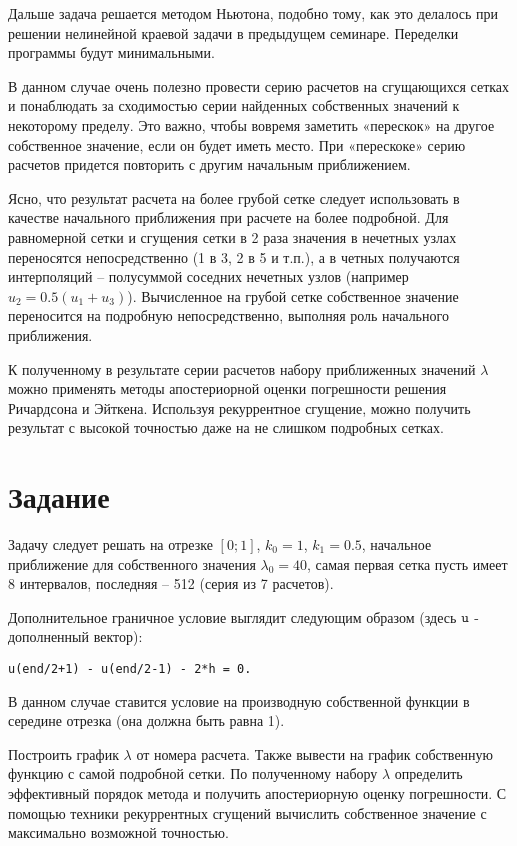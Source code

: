 Дальше задача решается методом Ньютона, подобно тому, как это делалось при решении нелинейной краевой задачи в предыдущем семинаре. Переделки программы будут минимальными.

В данном случае очень полезно провести серию расчетов на сгущающихся сетках и понаблюдать за сходимостью серии найденных собственных значений к некоторому пределу. Это важно, чтобы вовремя заметить «перескок» на другое собственное значение, если он будет иметь место. При «перескоке» серию расчетов придется повторить с другим начальным приближением.

Ясно, что результат расчета на более грубой сетке следует использовать в качестве начального приближения при расчете на более подробной. Для равномерной сетки и сгущения сетки в 2 раза значения в нечетных узлах переносятся непосредственно (1 в 3, 2 в 5 и т.п.), а в четных получаются интерполяций – полусуммой соседних нечетных узлов (например $u_2 = 0.5(u_1+u_3)$). Вычисленное на грубой сетке собственное значение переносится на подробную непосредственно, выполняя роль начального приближения.

К полученному в результате серии расчетов набору приближенных значений $\lambda$ можно применять методы апостериорной оценки погрешности решения Ричардсона и Эйткена. Используя рекуррентное сгущение, можно получить результат с высокой точностью даже на не слишком подробных сетках. 

\section{Задание}
Задачу следует решать на отрезке $[0; 1]$, $k_0 = 1$, $k_1 = 0.5$, начальное приближение для собственного значения $\lambda_0 = 40$, самая первая сетка пусть имеет 8 интервалов, последняя – 512  (серия из 7 расчетов). 

Дополнительное граничное условие выглядит следующим образом (здесь $\texttt{\lstinline|u|}$ - дополненный вектор):
\begin{matlablisting}
	\begin{lstlisting}
u(end/2+1) - u(end/2-1) - 2*h = 0.
	\end{lstlisting}
\end{matlablisting}
В данном случае ставится условие на производную собственной функции в середине отрезка (она должна быть равна 1).

Построить график $\lambda$ от номера расчета. Также вывести на график собственную функцию с самой подробной сетки. По полученному набору $\lambda$ определить эффективный порядок метода и получить апостериорную оценку погрешности. С помощью техники рекуррентных сгущений вычислить собственное значение с максимально возможной точностью.